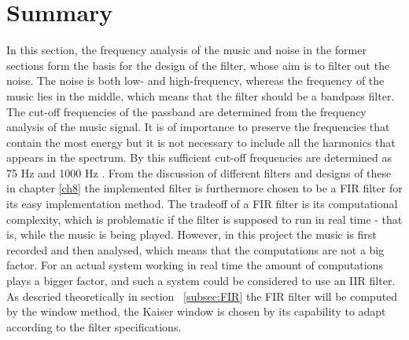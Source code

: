 \section{Summary} \label{sec:filtervalg}
In this section, the frequency analysis of the music and noise in the former sections form the basis for the design of the filter, whose aim is to filter out the noise. The noise is both low- and high-frequency, whereas the frequency of the music lies in the middle, which means that the filter should be a bandpass filter. The cut-off frequencies of the passband are determined from the frequency analysis of the music signal. It is of importance to preserve the frequencies that contain the most energy but it is not necessary to include all the harmonics that appears in the spectrum. By this sufficient cut-off frequencies are determined as 75 Hz and 1000 Hz .
From the discussion of different filters and designs of these in chapter \ref{ch8} the implemented filter is furthermore chosen to be a FIR filter for its easy implementation method. The tradeoff of a FIR filter is its computational complexity, which is problematic if the filter is supposed to run in real time - that is, while the music is being played. However, in this project the music is first recorded and then analysed, which means that the computations are not a big factor. For an actual system working in real time the amount of computations plays a bigger factor, and such a system could be considered to use an IIR filter.\\
As descried theoretically in section ~\ref{subsec:FIR} the FIR filter will be computed by the window method, the Kaiser window is chosen by its capability to adapt according to the filter specifications.     